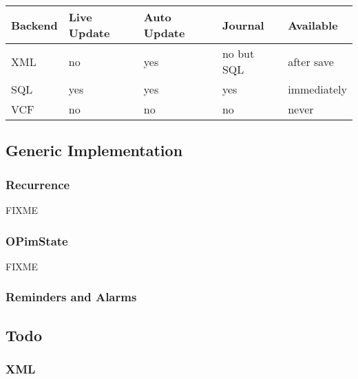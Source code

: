 \begin{center}
\begin{tabular}{|l|l|l|l|l|}
\hline
Backend & Live Update & Auto Update & Journal  & Available\\ \hline
XML & no  & yes & no but SQL & after save \\ \hline
SQL & yes & yes & yes        & immediately \\ \hline
VCF & no  & no  & no         & never      \\ \hline
\end{tabular}
\label{Feature of Backends}
\end{center}

\subsection{Generic Implementation}
\subsubsection{Recurrence}
FIXME
\subsubsection{OPimState}
FIXME
\subsubsection{Reminders and Alarms}

\subsection{Todo}
\subsubsection{XML}

